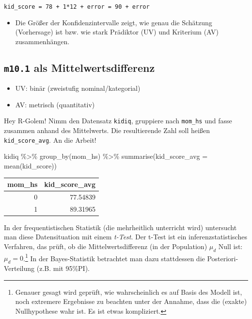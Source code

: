 \documentclass[
  a4paper,
  DIV=11]{scrreprt}
\newenvironment{Shaded}{\begin{snugshade}}{\end{snugshade}}
\newcommand{\AttributeTok}[1]{\textcolor[rgb]{0.40,0.45,0.13}{#1}}
\newcommand{\FunctionTok}[1]{\textcolor[rgb]{0.28,0.35,0.67}{#1}}
\newcommand{\NormalTok}[1]{\textcolor[rgb]{0.00,0.23,0.31}{#1}}
\newcommand{\SpecialCharTok}[1]{\textcolor[rgb]{0.37,0.37,0.37}{#1}}
\providecommand{\tightlist}{%
  \setlength{\itemsep}{0pt}\setlength{\parskip}{0pt}}\usepackage{longtable,booktabs,array}
\theoremstyle{definition}
\theoremstyle{remark}
\begin{document}
\texttt{kid\_score\ =\ 78\ +\ 1*12\ +\ error\ =\ 90\ +\ error}

\begin{itemize}
\tightlist
\item
  Die Größer der Konfidenzintervalle zeigt, wie genau die Schätzung
  (Vorhersage) ist bzw. wie stark Prädiktor (UV) und Kriterium (AV)
  zusammenhängen.
\end{itemize}

\hypertarget{m10.1-als-mittelwertsdifferenz}{%
\subsection{\texorpdfstring{\texttt{m10.1} als
Mittelwertsdifferenz}{m10.1 als Mittelwertsdifferenz}}\label{m10.1-als-mittelwertsdifferenz}}

\begin{itemize}
\tightlist
\item
  UV: binär (zweistufig nominal/kategorial)
\item
  AV: metrisch (quantitativ)
\end{itemize}

Hey R-Golem! Nimm den Datensatz \texttt{kidiq}, gruppiere nach
\texttt{mom\_hs} und fasse zusammen anhand des Mittelwerts. Die
resultierende Zahl soll heißen \texttt{kid\_score\_avg}. An die Arbeit!

\begin{Shaded}
\begin{Highlighting}[]
\NormalTok{kidiq }\SpecialCharTok{\%\textgreater{}\%} 
  \FunctionTok{group\_by}\NormalTok{(mom\_hs) }\SpecialCharTok{\%\textgreater{}\%} 
  \FunctionTok{summarise}\NormalTok{(}\AttributeTok{kid\_score\_avg =} 
              \FunctionTok{mean}\NormalTok{(kid\_score))}
\end{Highlighting}
\end{Shaded}

\begin{longtable}[]{@{}rr@{}}
\toprule()
mom\_hs & kid\_score\_avg \\
\midrule()
\endhead
0 & 77.54839 \\
1 & 89.31965 \\
\bottomrule()
\end{longtable}

In der frequentistischen Statistik (die mehrheitlich unterricht wird)
untersucht man diese Datensituation mit einem \emph{t-Test}. Der t-Test
ist ein inferenzstatistisches Verfahren, das prüft, ob die
Mittelwertsdifferenz (in der Population) \(\mu_d\) Null ist:
\(\mu_d = 0\).\footnote{Genauer gesagt wird geprüft, wie wahrscheinlich
  es auf Basis des Modell ist, noch extremere Ergebnisse zu beachten
  unter der Annahme, dass die (exakte) Nullhypothese wahr ist. Es ist
  etwas kompliziert.} In der Bayes-Statistik betrachtet man dazu
stattdessen die Posteriori-Verteilung (z.B. mit 95\%PI).
\end{document}
